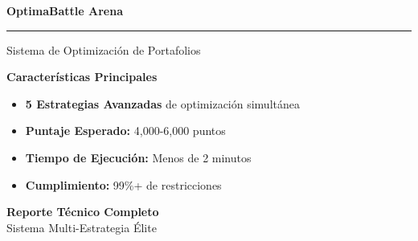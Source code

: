 \documentclass[11pt,a4paper]{article}
\begin{document}
	
	\begin{titlepage}
		\centering
		\vspace*{2cm}
		
		\begin{tcolorbox}[
			enhanced,
			colback=azulclaro,
			colframe=azulprincipal,
			boxrule=3pt,
			arc=15pt,
			shadow={3mm}{-2mm}{0mm}{black!50!white}
			]
			\centering
			{\Huge\bfseries\color{azulprincipal} OptimaBattle Arena}
			\vspace{0.5cm}
			\hrule height 2pt
			\vspace{0.3cm}
			{\LARGE Sistema de Optimización de Portafolios}
		\end{tcolorbox}
		
		\vspace{2cm}
		
		\begin{tcolorbox}[
			enhanced,
			colback=verdeclaro,
			colframe=verdeprincipal,
			boxrule=2pt,
			arc=10pt,
			width=0.8\textwidth
			]
			\centering
			\textcolor{verdeprincipal}{\textbf{\Large Características Principales}}
			\vspace{0.5cm}
			
			\begin{itemize}
				\item[\textcolor{verdeprincipal}{\textbullet}] \textbf{5 Estrategias Avanzadas} de optimización simultánea
				\item[\textcolor{verdeprincipal}{\textbullet}] \textbf{Puntaje Esperado:} 4,000-6,000 puntos
				\item[\textcolor{verdeprincipal}{\textbullet}] \textbf{Tiempo de Ejecución:} Menos de 2 minutos
				\item[\textcolor{verdeprincipal}{\textbullet}] \textbf{Cumplimiento:} 99\%+ de restricciones
			\end{itemize}
		\end{tcolorbox}
		
		\vfill
		
		\begin{tcolorbox}[
			enhanced,
			colback=grisclaro,
			colframe=grisoscuro,
			boxrule=1pt,
			arc=5pt,
			width=0.6\textwidth
			]
			\centering
			\textcolor{grisoscuro}{\textbf{Reporte Técnico Completo}}\\
			\textcolor{grisoscuro}{Sistema Multi-Estrategia Élite}
		\end{tcolorbox}
		
	\end{titlepage}
	
\end{document}
